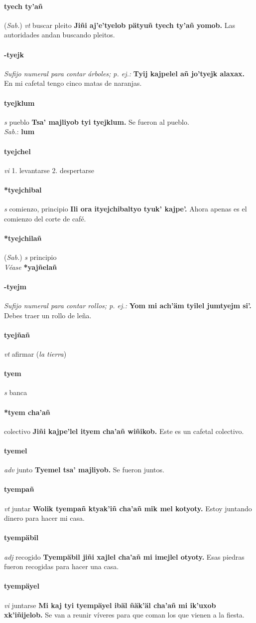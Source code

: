 \documentclass{scrbook}
\newcommand{\entry}[1]{\paragraph{#1}}
\newcommand{\onedefinition}[1]{#1.}
\newcommand{\nontranslationdef}[1]{\textit{#1}}
\newcommand{\partofspeech}[1]{\textit{#1}}
\newcommand{\spanishtranslation}[1]{#1}
\newcommand{\clarification}[1]{(\textit{#1})}
\newcommand{\cholexample}[1]{\textbf{#1}}
\newcommand{\exampletranslation}[1]{#1}
\newcommand{\dialectvariant}[1]{\\\textit{#1}:}
\newcommand{\dialectword}[1]{\textbf{#1}}
\newcommand{\alsosee}[1]{\\\textit{Véase} \textbf{#1}}
\newcommand{\relevantdialect}[1]{(\textit{#1})}
\begin{document}
\begin{multicols}{2}
\entry{tyech ty'añ}
\relevantdialect{Sab.}
\partofspeech{vt}
\spanishtranslation{buscar pleito}
\cholexample{Jiñi aj'e'tyelob pätyuñ tyech ty'añ yomob.}
\exampletranslation{Las autoridades andan buscando pleitos.}

\entry{-tyejk}
\nontranslationdef{Sufijo numeral para contar árboles; p. ej.:}
\cholexample{Tyij kajpelel añ jo'tyejk alaxax.}
\exampletranslation{En mi cafetal tengo cinco matas de naranjas.}

\entry{tyejklum}
\partofspeech{s}
\spanishtranslation{pueblo}
\cholexample{Tsa' majliyob tyi tyejklum.}
\exampletranslation{Se fueron al pueblo.}
\dialectvariant{Sab.}
\dialectword{lum}

\entry{tyejchel}
\partofspeech{vi}
\onedefinition{1}
\spanishtranslation{levantarse}
\onedefinition{2}
\spanishtranslation{despertarse}

\entry{*tyejchibal}
\partofspeech{s}
\spanishtranslation{comienzo, principio}
\cholexample{Ili ora ityejchibaltyo tyuk' kajpe'.}
\exampletranslation{Ahora apenas es el comienzo del corte de café.}

\entry{*tyejchilañ}
\relevantdialect{Sab.}
\partofspeech{s}
\spanishtranslation{principio}
\alsosee{*yajñelañ}

\entry{-tyejm}
\nontranslationdef{Sufijo numeral para contar rollos; p. ej.:}
\cholexample{Yom mi ach'äm tyilel jumtyejm si'.}
\exampletranslation{Debes traer un rollo de leña.}

\entry{tyejñañ}
\partofspeech{vt}
\spanishtranslation{afirmar}
\clarification{la tierra}

\entry{tyem}
\partofspeech{s}
\spanishtranslation{banca}

\entry{*tyem cha'añ}
\spanishtranslation{colectivo}
\cholexample{Jiñi kajpe'lel ityem cha'añ wiñikob.}
\exampletranslation{Este es un cafetal colectivo.}

\entry{tyemel}
\partofspeech{adv}
\spanishtranslation{junto}
\cholexample{Tyemel tsa' majliyob.}
\exampletranslation{Se fueron juntos.}

\entry{tyempañ}
\partofspeech{vt}
\spanishtranslation{juntar}
\cholexample{Wolik tyempañ ktyak'iñ cha'añ mik mel kotyoty.}
\exampletranslation{Estoy juntando dinero para hacer mi casa.}

\entry{tyempäbil}
\partofspeech{adj}
\spanishtranslation{recogido}
\cholexample{Tyempäbil jiñi xajlel cha'añ mi imejlel otyoty.}
\exampletranslation{Esas piedras fueron recogidas para hacer una casa.}

\entry{tyempäyel}
\partofspeech{vi}
\spanishtranslation{juntarse}
\cholexample{Mi kaj tyi tyempäyel ibäl ñäk'äl cha'añ mi ik'uxob xk'iñijelob.}
\exampletranslation{Se van a reunir víveres para que coman los que vienen a la fiesta.}


\end{multicols}
\end{document}
